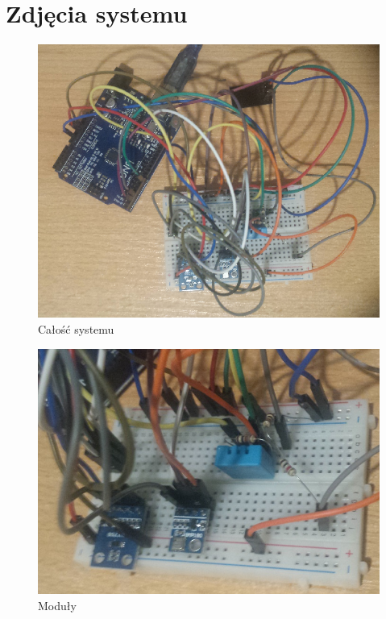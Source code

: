\documentclass[polish, 11pt]{article}
\begin{document}
\section{Zdjęcia systemu}
\begin{figure}[H]
    \centering
    \includegraphics[scale=0.6]{all.png}
\caption{Całość systemu}
\end{figure}

\begin{figure}[H]
    \centering
    \includegraphics[scale=0.5]{modules.jpg}
\caption{Moduły}
\end{figure}
\end{document}
